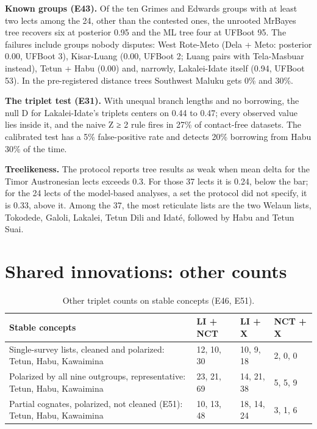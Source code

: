 \documentclass[11pt]{article}
\newcommand{\hd}[1]{\begin{minipage}[b]{\linewidth}\raggedright #1\end{minipage}}
\begin{document}
\textbf{Known groups (E43).} Of the ten Grimes and Edwards groups with at least two lects among the 24, other than the contested ones, the unrooted MrBayes tree recovers six at posterior 0.95 and the ML tree four at UFBoot 95. The failures include groups nobody disputes: West Rote-Meto (Dela + Meto: posterior 0.00, UFBoot 3), Kisar-Luang (0.00, UFBoot 2; Luang pairs with Tela-Masbuar instead), Tetun + Habu (0.00) and, narrowly, Lakalei-Idate itself (0.94, UFBoot 53). In the pre-registered distance trees Southwest Maluku gets 0\% and 30\%.

\textbf{The triplet test (E31).} With unequal branch lengths and no borrowing, the null D for Lakalei-Idate's triplets centers on 0.44 to 0.47; every observed value lies inside it, and the naive Z ≥ 2 rule fires in 27\% of contact-free datasets. The calibrated test has a 5\% false-positive rate and detects 20\% borrowing from Habu 30\% of the time.

\textbf{Treelikeness.} The protocol reports tree results as weak when mean delta \citep{holland2002,gray2010} for the Timor Austronesian lects exceeds 0.3. For those 37 lects it is 0.24, below the bar; for the 24 lects of the model-based analyses, a set the protocol did not specify, it is 0.33, above it. Among the 37, the most reticulate lists are the two Welaun lists, Tokodede, Galoli, Lakalei, Tetun Dili and Idaté, followed by Habu and Tetun Suai.

\section{Shared innovations: other counts}\label{sec:innov}

\begin{table}[tbp]
\caption{Other triplet counts on stable concepts (E46,
E51).}
\label{tab:S-triplets}
\begin{tabularx}{\linewidth}{@{}L{2.636}L{0.454}L{0.454}L{0.456}@{}}
\toprule
\hd{Stable concepts} & \hd{LI + NCT} & \hd{LI + X} & \hd{NCT + X} \\
\midrule
Single-survey lists, cleaned and polarized: Tetun, Habu, Kawaimina & 12, 10, 30 & 10, 9, 18 & 2, 0, 0 \\
Polarized by all nine outgroups, representative: Tetun, Habu, Kawaimina & 23, 21, 69 & 14, 21, 38 & 5, 5, 9 \\
Partial cognates, polarized, not cleaned (E51): Tetun, Habu, Kawaimina & 10, 13, 48 & 18, 14, 24 & 3, 1, 6 \\
\bottomrule
\end{tabularx}
\end{table}
\end{document}
